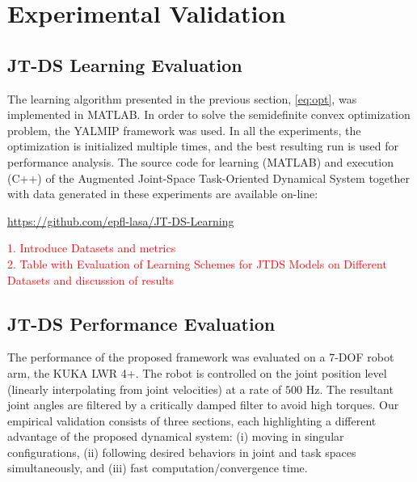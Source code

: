 \documentclass[letterpaper, 10 pt, conference,fleqn]{ieeeconf}
\begin{document}
\section{Experimental Validation} \label{Sec:Exp}

\subsection{JT-DS Learning  Evaluation}

The learning algorithm presented in the previous section, \eqref{eq:opt}, was implemented in MATLAB. In order to solve the semidefinite convex optimization problem, the YALMIP framework \cite{lofberg2004yalmip} was used. In all the experiments, the optimization is initialized multiple times, and the best resulting run is used for performance analysis. The source code for learning (MATLAB) and execution (C++) of the Augmented Joint-Space Task-Oriented Dynamical System together with data generated in these experiments are available on-line: 
\centerline{\small \underline{\url{https://github.com/epfl-lasa/JT-DS-Learning}}}

\textcolor{red}{1. Introduce Datasets and metrics}\\

\textcolor{red}{2. Table with Evaluation of Learning Schemes for JTDS Models on Different Datasets  and discussion of results}

\newpage
\subsection{JT-DS Performance Evaluation}
The performance of the proposed framework was evaluated on a 7-DOF robot arm, the KUKA LWR 4+. The robot is controlled on the joint position level (linearly interpolating from joint velocities) at a rate of $ 500 $ Hz. The resultant joint angles are filtered by a critically damped filter to avoid high torques. Our empirical validation consists of three sections, each highlighting a different advantage of the proposed dynamical system: (i) moving in singular configurations, (ii) following desired behaviors in joint and task spaces simultaneously, and (iii) fast computation/convergence time.
\end{document}
